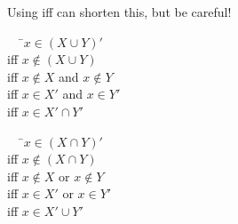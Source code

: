 \documentclass[../notes.tex]{subfiles}
\begin{document}
			Using iff can shorten this, but be careful!
			\begin{example}
				\begin{tabbing}
					$\quad$ \=$x \in (X \cup Y)'$\\
					iff \>$x \notin (X \cup Y)$\\
					iff \>$x \notin X$ and $x \notin Y$\\
					iff \>$x \in X'$ and $x \in Y'$\\
					iff \>$x \in X' \cap Y'$
				\end{tabbing}
				\begin{tabbing}
					$\quad$ \=$x \in (X \cap Y)'$\\
					iff \> $x \notin (X \cap Y)$\\
					iff \> $x \notin X$ or $x \notin Y$\\
					iff \> $x \in X'$ or $x \in Y'$\\
					iff \> $x \in X' \cup Y'$
				\end{tabbing}
			\end{example}
			\pagebreak
\end{document}
